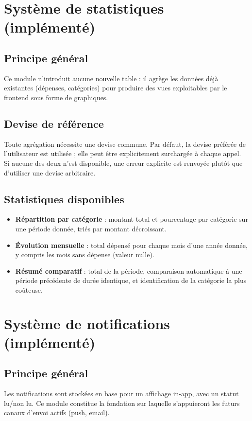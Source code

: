 \documentclass[11pt,a4paper]{article}
\begin{document}
\section{Système de statistiques (implémenté)}

\subsection{Principe général}
Ce module n'introduit aucune nouvelle table : il agrège les données déjà existantes (dépenses, catégories) pour produire des vues exploitables par le frontend sous forme de graphiques.

\subsection{Devise de référence}
Toute agrégation nécessite une devise commune. Par défaut, la devise préférée de l'utilisateur est utilisée ; elle peut être explicitement surchargée à chaque appel. Si aucune des deux n'est disponible, une erreur explicite est renvoyée plutôt que d'utiliser une devise arbitraire.

\subsection{Statistiques disponibles}
\begin{itemize}[leftmargin=*]
    \item \textbf{Répartition par catégorie} : montant total et pourcentage par catégorie sur une période donnée, triés par montant décroissant.
    \item \textbf{Évolution mensuelle} : total dépensé pour chaque mois d'une année donnée, y compris les mois sans dépense (valeur nulle).
    \item \textbf{Résumé comparatif} : total de la période, comparaison automatique à une période précédente de durée identique, et identification de la catégorie la plus coûteuse.
\end{itemize}

\section{Système de notifications (implémenté)}

\subsection{Principe général}
Les notifications sont stockées en base pour un affichage in-app, avec un statut lu/non lu. Ce module constitue la fondation sur laquelle s'appuieront les futurs canaux d'envoi actifs (push, email).
\end{document}
